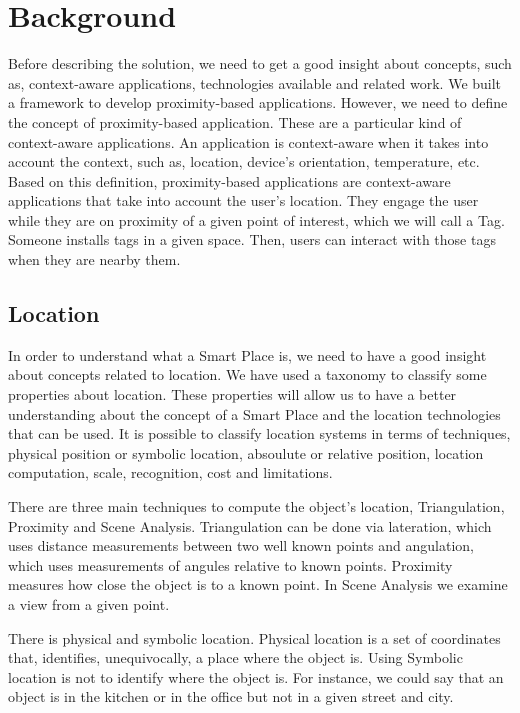 
\section{Background}
\label{sec:background}
Before describing the solution, we need to get a good insight about concepts, such as, context-aware applications, technologies available and related work.
We built a framework to develop proximity-based applications.
However, we need to define the concept of proximity-based application.
These are a particular kind of context-aware applications.
An application is context-aware when it takes into account the context, such as, location, device's orientation, temperature, etc.
Based on this definition, proximity-based applications are context-aware applications that take into account the user's location.
They engage the user while they are on proximity of a given point of interest, which we will call a Tag.
Someone installs tags in a given space.
Then, users can interact with those tags when they are nearby them.

\subsection{Location}
\label{sec:background_location}
In order to understand what a Smart Place is, we need to have a good insight about concepts related to location.
We have used a taxonomy\cite{location} to classify some properties about location.
These properties will allow us to have a better understanding about the concept of a Smart Place and the location technologies that can be used.
It is possible to classify location systems in terms of techniques, physical position or symbolic location, absoulute or relative position, location computation, scale, recognition, cost and limitations.

There are three main techniques to compute the object's location, Triangulation, Proximity and Scene Analysis.
Triangulation can be done via lateration, which uses distance measurements between two well known points and angulation, which uses measurements of angules relative to known points.
Proximity measures how close the object is to a known point.
In Scene Analysis we examine a view from a given point.

There is physical and symbolic location.
Physical location is a set of coordinates that, identifies, unequivocally, a place where the object is.
Using Symbolic location is not to identify where the object is. For instance, we could say that an object is in the kitchen or in the office but not in a given street and city.

